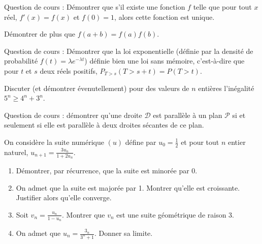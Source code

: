 \begin{question}[topic=exponentielle]
  Question de cours : Démontrer que s'il existe une fonction $f$ telle que
  pour tout $x$ réel, $f'(x) = f(x)$ et $f(0) = 1$, alors cette fonction
  est unique.

  Démontrer de plus que $f(a+b) = f(a)f(b)$.
\end{question}

\begin{question}[topic=loi_exponentielle]
  Question de cours : Démontrer que la loi exponentielle (définie par la
  densité de probabilité $f(t) = \lambda e^{-\lambda t}$) définie bien une
  loi sans mémoire, c'est-à-dire que pour $t$ et $s$ deux réels positifs,
  $P_{T>s}(T > s+t) = P(T > t)$.
\end{question}

\begin{question}[topic=recurrence]
  Discuter (et démontrer évenutellement) pour des valeurs de $n$ entières
  l'inégalité $5^n \geqslant 4^n + 3^n$.
\end{question}

\begin{question}[topic=géométrie]
  Question de cours : démontrer qu'une droite $\mathcal{D}$ est
  parallèle à un plan $\mathcal{P}$ si et seulement si elle est parallèle
  à deux droites sécantes de ce plan.
\end{question}

\begin{question}[topic=suite]
  On considère la suite numérique $(u)$ défine par $u_0 = \frac12$ et pour
  tout $n$ entier naturel, $u_{n+1} = \frac{3u_n}{1 + 2u_n}$.

  \begin{enumerate}
    \item Démontrer, par récurrence, que la suite est minorée par 0.
    \item On admet que la suite est majorée par 1. Montrer qu'elle est
      croissante. Justifier alors qu'elle converge.
    \item Soit $v_n = \frac{u_n}{1 - u_n}$. Montrer que $v_n$ est une
      suite géométrique de raison 3.
    \item On admet que $u_n = \frac{3_n}{3^n + 1}$. Donner sa limite.
  \end{enumerate}
\end{question}

